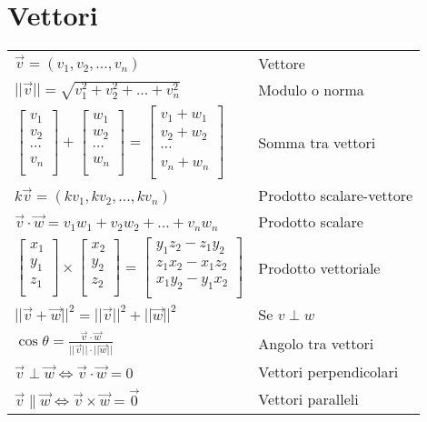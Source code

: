 \section{Vettori}
\begin{tabular}{@{}ll@{}}
	$\vec{v} = (v_1, v_2, ..., v_n)$ & Vettore \\
	$||\vec{v}|| = \sqrt{v_1^2 + v_2^2 + ... + v_n^2}$ & Modulo o norma \\
	$
		\begin{bmatrix}
			v_1 \\[-0.3em]
			v_2 \\[-0.3em]
			\cdots \\[-0.3em]
			v_n \\
		\end{bmatrix}
		+
		\begin{bmatrix}
			w_1 \\[-0.3em]
			w_2 \\[-0.3em]
			\cdots \\[-0.3em]
			w_n \\
		\end{bmatrix}
		=
		\begin{bmatrix}
			v_1 + w_1 \\[-0.3em]
			v_2 + w_2 \\[-0.3em]
			\cdots \\[-0.3em]
			v_n + w_n \\
		\end{bmatrix}
	$ & Somma tra vettori \\
	$k \vec{v} = (k v_1, k v_2, ..., k v_n)$ & Prodotto scalare-vettore \\
	$\vec{v} \cdot \vec{w} = v_1 w_1 + v_2 w_2 + ... + v_n w_n$ & Prodotto scalare \\
	$
	\begin{bmatrix}
		x_1 \\[-0.3em]
		y_1 \\[-0.3em]
		z_1 \\
	\end{bmatrix}
	\times
	\begin{bmatrix}
		x_2 \\[-0.3em]
		y_2 \\[-0.3em]
		z_2 \\
	\end{bmatrix}
	=
	\begin{bmatrix}
		y_1z_2 - z_1y_2 \\[-0.3em]
		z_1x_2 - x_1z_2 \\[-0.3em]
		x_1y_2 - y_1x_2 \\
	\end{bmatrix}
	$ & Prodotto vettoriale \\
	$||\vec{v}+\vec{w}||^2 = ||\vec{v}||^2 + ||\vec{w}||^2$ & Se $v \perp w$ \\
	$\cos{\theta} = \frac{\vec{v} \cdot \vec{w}}{||\vec{v}|| \cdot ||\vec{w}||}$ & Angolo tra vettori \\
	$\vec{v} \perp \vec{w} \Leftrightarrow \vec{v} \cdot \vec{w} = 0$ & Vettori perpendicolari \\
	$\vec{v} \parallel \vec{w} \Leftrightarrow \vec{v} \times \vec{w} = \vec{0}$ & Vettori paralleli \\
\end{tabular}